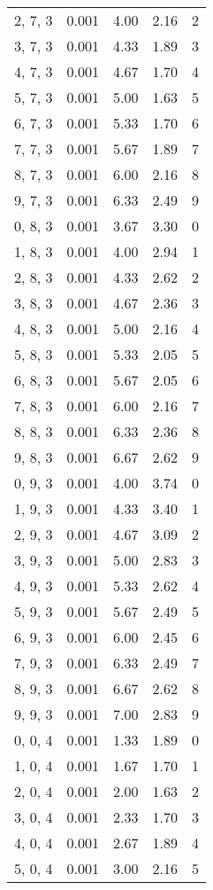 \documentclass[12pt]{article}
\begin{document}
\begin{tabular}{c || c || c | c | c}
2, 7, 3 & 0.001 & 4.00 & 2.16 & 2 \\
3, 7, 3 & 0.001 & 4.33 & 1.89 & 3 \\
4, 7, 3 & 0.001 & 4.67 & 1.70 & 4 \\
5, 7, 3 & 0.001 & 5.00 & 1.63 & 5 \\
6, 7, 3 & 0.001 & 5.33 & 1.70 & 6 \\
7, 7, 3 & 0.001 & 5.67 & 1.89 & 7 \\
8, 7, 3 & 0.001 & 6.00 & 2.16 & 8 \\
9, 7, 3 & 0.001 & 6.33 & 2.49 & 9 \\
0, 8, 3 & 0.001 & 3.67 & 3.30 & 0 \\
1, 8, 3 & 0.001 & 4.00 & 2.94 & 1 \\
2, 8, 3 & 0.001 & 4.33 & 2.62 & 2 \\
3, 8, 3 & 0.001 & 4.67 & 2.36 & 3 \\
4, 8, 3 & 0.001 & 5.00 & 2.16 & 4 \\
5, 8, 3 & 0.001 & 5.33 & 2.05 & 5 \\
6, 8, 3 & 0.001 & 5.67 & 2.05 & 6 \\
7, 8, 3 & 0.001 & 6.00 & 2.16 & 7 \\
8, 8, 3 & 0.001 & 6.33 & 2.36 & 8 \\
9, 8, 3 & 0.001 & 6.67 & 2.62 & 9 \\
0, 9, 3 & 0.001 & 4.00 & 3.74 & 0 \\
1, 9, 3 & 0.001 & 4.33 & 3.40 & 1 \\
2, 9, 3 & 0.001 & 4.67 & 3.09 & 2 \\
3, 9, 3 & 0.001 & 5.00 & 2.83 & 3 \\
4, 9, 3 & 0.001 & 5.33 & 2.62 & 4 \\
5, 9, 3 & 0.001 & 5.67 & 2.49 & 5 \\
6, 9, 3 & 0.001 & 6.00 & 2.45 & 6 \\
7, 9, 3 & 0.001 & 6.33 & 2.49 & 7 \\
8, 9, 3 & 0.001 & 6.67 & 2.62 & 8 \\
9, 9, 3 & 0.001 & 7.00 & 2.83 & 9 \\
0, 0, 4 & 0.001 & 1.33 & 1.89 & 0 \\
1, 0, 4 & 0.001 & 1.67 & 1.70 & 1 \\
2, 0, 4 & 0.001 & 2.00 & 1.63 & 2 \\
3, 0, 4 & 0.001 & 2.33 & 1.70 & 3 \\
4, 0, 4 & 0.001 & 2.67 & 1.89 & 4 \\
5, 0, 4 & 0.001 & 3.00 & 2.16 & 5 \\

\end{tabular}
\end{document}
